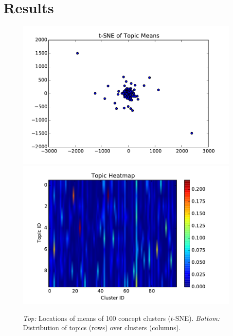 \documentclass[11pt]{article}
\begin{document}
\section{Results}
\begin{figure}
\centering
\includegraphics[width=\columnwidth]{assets/gtm100_mu_tsne.pdf}
\includegraphics[width=\columnwidth]{assets/gtm100_topic_heatmap.pdf}
\caption{\label{fig:gtm-globals} \emph{Top:} Locations of means of 100 concept clusters ($t$-SNE). \emph{Bottom:} Distribution of topics (rows) over clusters (columns).}
\end{figure}
\end{document}
